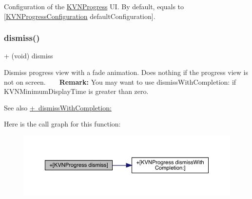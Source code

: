 Configuration of the {\ttfamily \mbox{\hyperlink{interface_k_v_n_progress}{K\+V\+N\+Progress}}} UI. By default, equals to {\ttfamily \mbox{[}\mbox{\hyperlink{interface_k_v_n_progress_configuration}{K\+V\+N\+Progress\+Configuration}} default\+Configuration\mbox{]}}. \mbox{\label{interface_k_v_n_progress_a4b11cd2b647d08b5c05cf79b99e3f588}} 
\subsubsection{\texorpdfstring{dismiss()}{dismiss()}\hspace{0.1cm}{\footnotesize\ttfamily [1/3]}}
{\footnotesize\ttfamily + (void) dismiss \begin{DoxyParamCaption}{ }\end{DoxyParamCaption}}

Dismiss progress view with a fade animation. Does nothing if the progress view is not on screen. ~\newline
~\newline
{\bfseries Remark\+:} You may want to use {\ttfamily dismiss\+With\+Completion\+:} if {\ttfamily K\+V\+N\+Minimum\+Display\+Time} is greater than zero. \begin{DoxySeeAlso}{See also}
\mbox{\hyperlink{interface_k_v_n_progress_a7ec9c844ebb26d0f9cdff6ef3d737d28}{+ dismiss\+With\+Completion\+:}} 
\end{DoxySeeAlso}
Here is the call graph for this function\+:\nopagebreak
\begin{figure}[H]
\begin{center}
\leavevmode
\includegraphics[width=350pt]{interface_k_v_n_progress_a4b11cd2b647d08b5c05cf79b99e3f588_cgraph}
\end{center}
\end{figure}
\mbox{\label{interface_k_v_n_progress_a4b11cd2b647d08b5c05cf79b99e3f588}} 
